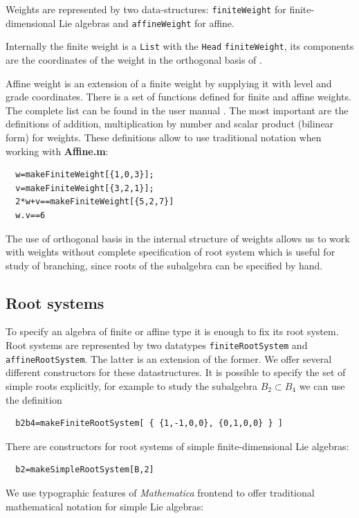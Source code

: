 \documentclass[preprint,12pt]{elsarticle}
\begin{document}
Weights are represented  by two data-structures: \lstinline{finiteWeight} for finite-dimensional Lie algebras and \lstinline{affineWeight}  for affine.

Internally the finite weight is a \lstinline{List} with the
\lstinline{Head} \lstinline{finiteWeight}, its components are the
coordinates of the weight in the orthogonal basis of
\cite{bourbaki2002lie}.

Affine weight is an extension of a finite weight by supplying it
with level and grade coordinates. There is a set of functions
defined for finite and affine weights. The complete list can be
found in the user manual \cite{affinemanual}. The most important
are the definitions of addition, multiplication by number and
scalar product (bilinear form) for weights. These definitions
allow to use traditional notation when working with {\bf
Affine.m}:
\begin{lstlisting}
  w=makeFiniteWeight[{1,0,3}];
  v=makeFiniteWeight[{3,2,1}];
  2*w+v==makeFiniteWeight[{5,2,7}]
  w.v==6
\end{lstlisting}

The use of orthogonal basis in the internal structure of weights allows us to work with weights without complete specification of root system which is useful for study of branching, since roots of the subalgebra can be specified by hand.

\subsection{Root systems}
\label{sec:root-systems}

To specify an algebra of finite or affine type it is enough to fix
its root system. Root systems are represented by two datatypes
\lstinline{finiteRootSystem} and \lstinline{affineRootSystem}. The
latter is an extension of the former. We offer several different
constructors for these datastructures. It is possible to specify
the set of simple roots explicitly, for example to study the
subalgebra $B_2\subset B_4$ we can use the definition
\begin{lstlisting}
  b2b4=makeFiniteRootSystem[ { {1,-1,0,0}, {0,1,0,0} } ]
\end{lstlisting}
There are constructors for root systems of simple finite-dimensional Lie algebras:
\begin{lstlisting}
  b2=makeSimpleRootSystem[B,2]
\end{lstlisting}
We use typographic features of {\it Mathematica} frontend to offer traditional mathematical notation for simple Lie algebras:
\end{document}
